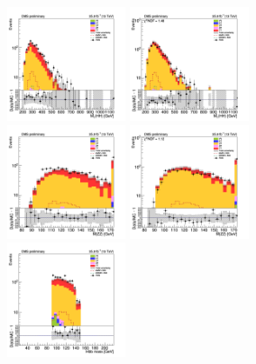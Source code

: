 \begin{figure}[tbp]
\begin{center}
    \includegraphics[width=0.31\textwidth]{figures/ee_300_SR_april21/hhMt_ee_SR_prefit_plot_apr21.png}
    \includegraphics[width=0.31\textwidth]{figures/ee_300_SR_april21/hhMt_ee_SR_FullPostfit_plot_apr21.png}\\
    \includegraphics[width=0.31\textwidth]{figures/ee_300_SR_april21/hmass0_ee_SR_prefit_plot_apr21.png}
    \includegraphics[width=0.31\textwidth]{figures/ee_300_SR_april21/hmass0_ee_SR_FullPostfit_plot_apr21.png}\\
    \includegraphics[width=0.31\textwidth]{figures/ee_300_SR_april21/hmass1_ee_SR_prefit_plot_apr21.png}

\end{center}
\end{figure}
